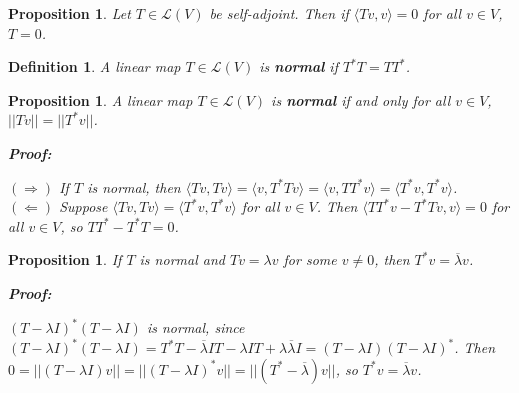 \documentclass{article}
\theoremstyle{colontheorem}
\newtheorem{proposition}[theorem]{Proposition}
\newtheorem{definition}[theorem]{Definition}
\newenvironment{Proposition}
{
	\begin{mdframed}[backgroundcolor=PropPink!10]
	\begin{proposition}
}
{
	\end{proposition}
	\end{mdframed}
	
	\vspace{.15in}
}
\newenvironment{Def}
{
	\begin{mdframed}[backgroundcolor=DefGreen!10]
	\begin{definition}
}
{
	\end{definition}
	\end{mdframed}
	
	\vspace{.15in}
}
\newenvironment{Proof}
{
	\begin{mdframed}[backgroundcolor=ProofPurple!10]
	\textbf{Proof:}%
}
{
	\end{mdframed}
	
	\vspace{.085in}
}
\begin{document}
\begin{Proposition}
	
	Let $T \in \mathcal{L}(V)$ be self-adjoint. Then if $\langle Tv, v \rangle = 0$ for all $v \in V$, $T = 0$.
	
\end{Proposition}



\begin{Def}
	
	A linear map $T \in \mathcal{L}(V)$ is \textbf{normal} if $T^* T = TT^*$.
	
\end{Def}



\begin{Proposition}
	
	A linear map $T \in \mathcal{L}(V)$ is \textbf{normal} if and only for all $v \in V$, $||Tv|| = ||T^* v||$.
	
	\begin{Proof}
		$(\Rightarrow)$ If $T$ is normal, then $\langle Tv, Tv \rangle = \langle v, T^* T v \rangle = \langle v, T T^* v \rangle = \langle T^* v, T^* v \rangle$.\\
		
		$(\Leftarrow)$ Suppose $\langle Tv, Tv \rangle = \langle T^* v, T^* v \rangle$ for all $v \in V$. Then $\langle TT^* v - T^* T v, v \rangle = 0$ for all $v \in V$, so $TT^* - T^* T = 0$.
		
	\end{Proof}
	
\end{Proposition}



\begin{Proposition}
	
	If $T$ is normal and $Tv = \lambda v$ for some $v \neq 0$, then $T^* v = \overline{\lambda} v$.
	
	\begin{Proof}
		$(T- \lambda I)^* (T - \lambda I)$ is normal, since $(T- \lambda I)^* (T - \lambda I) = T^* T - \overline{\lambda} IT - \lambda IT + \lambda \overline{\lambda} I = (T- \lambda I)(T - \lambda I)^*$. Then $0 = ||(T - \lambda I)v|| = ||(T - \lambda I)^* v|| = ||(T^* - \overline{\lambda})v||$, so $T^* v = \overline{\lambda} v$.
		
	\end{Proof}
	
\end{Proposition}
\end{document}
